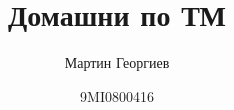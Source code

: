 \documentclass[a4paper, fleqn]{article}
\title{Домашни по ТМ}
\author{Мартин Георгиев}
\date{9MI0800416}
\theoremstyle{cooltheorem}
\theoremstyle{remark}
\begin{document}
\maketitle








\bigbreak











\end{document}
